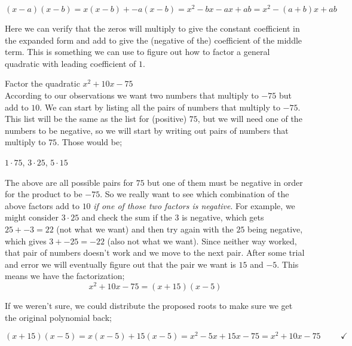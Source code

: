 \documentclass{ximera}
\begin{document}
    \[
        (x-a)(x-b) = x(x-b) + -a(x-b) = x^2 - bx - ax + ab = x^2 - (a + b)x + ab
    \]
    
    Here we can verify that the zeros will multiply to give the constant coefficient in the expanded form and add to give the (negative of the) coefficient of the middle term. This is something we can use to figure out how to factor a general quadratic with leading coefficient of $1$.
    
    \begin{example}
        Factor the quadratic $x^2 + 10x - 75$\\
        
        According to our observations we want two numbers that multiply to $-75$ but add to $10$. We can start by listing all the pairs of numbers that multiply to $-75$. This list will be the same as the list for (positive) $75$, but we will need one of the numbers to be negative, so we will start by writing out pairs of numbers that multiply to $75$. Those would be;
        
        \begin{center}
            $1 \cdot 75$, \hspace{2cm} $3 \cdot 25$, \hspace{2cm} $5 \cdot 15$
        \end{center}
        
        The above are all possible pairs for $75$ but one of them must be negative in order for the product to be $-75$. So we really want to see which combination of the above factors add to $10$ \textit{if one of those two factors is negative}. For example, we might consider $3 \cdot 25$ and check the sum if the $3$ is negative, which gets $25 + -3 = 22$ (not what we want) and then try again with the $25$ being negative, which gives $3 + -25 = -22$ (also not what we want). Since neither way worked, that pair of numbers doesn't work and we move to the next pair. After some trial and error we will eventually figure out that the pair we want is $15$ and $-5$. This means we have the factorization;
        \[
            x^2 + 10x - 75 = (x + 15)(x - 5)
        \]
        
        If we weren't sure, we could distribute the proposed roots to make sure we get the original polynomial back;
        
        \[
            (x + 15)(x - 5) = x(x - 5) + 15(x - 5) = x^2 - 5x + 15x - 75 = x^2 + 10x - 75 \hspace{1cm} \checkmark
        \]
    \end{example}%
    
\end{document}
